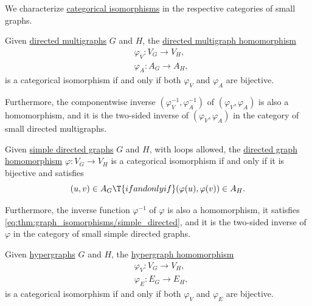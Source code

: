 \begin{proposition}\label{thm:graph_isomorphisms}
  We characterize \hyperref[def:morphism_invertibility/isomorphism]{categorical isomorphisms} in the respective categories of small graphs.

  \begin{thmenum}
     Given \hyperref[def:directed_multigraph]{directed multigraphs} \( G \) and \( H \), the \hyperref[def:directed_multigraph/morphism]{directed multigraph homomorphism}
    \begin{align*}
      &\varphi_V: V_G \to V_H, \\
      &\varphi_A: A_G \to A_H,
    \end{align*}
    is a categorical isomorphism if and only if both \( \varphi_V \) and \( \varphi_A \) are bijective.

    Furthermore, the componentwise inverse \( (\varphi_V^{-1}, \varphi_A^{-1}) \) of \( (\varphi_V, \varphi_A) \) is also a homomorphism, and it is the two-sided inverse of \( (\varphi_V, \varphi_A) \) in the category of small directed multigraphs.

     Given \hyperref[def:directed_graph]{simple directed graphs} \( G \) and \( H \), with loops allowed, the \hyperref[def:directed_graph/morphism]{directed graph homomorphism} \( \varphi: V_G \to V_H \) is a categorical isomorphism if and only if it is bijective and satisfies
    \begin{equation}\label{eq:thm:graph_isomorphisms/simple_directed}
      (u, v) \in A_G \T{if and only if} (\varphi(u), \varphi(v)) \in A_H.
    \end{equation}

    Furthermore, the inverse function \( \varphi^{-1} \) of \( \varphi \) is also a homomorphism, it satisfies \eqref{eq:thm:graph_isomorphisms/simple_directed}, and it is the two-sided inverse of \( \varphi \) in the category of small simple directed graphs.

     Given \hyperref[def:hypergraph]{hypergraphs} \( G \) and \( H \), the \hyperref[def:hypergraph/morphism]{hypergraph homomorphism}
    \begin{align*}
      &\varphi_V: V_G \to V_H, \\
      &\varphi_E: E_G \to E_H,
    \end{align*}
    is a categorical isomorphism if and only if both \( \varphi_V \) and \( \varphi_E \) are bijective.


\end{thmenum}
\end{proposition}
